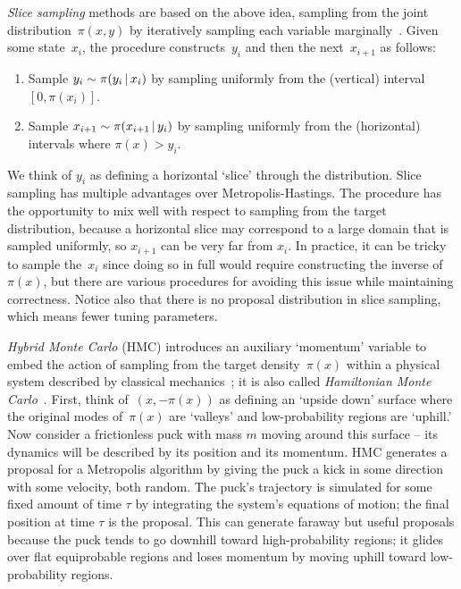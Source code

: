 \documentclass[angelino.tex]{subfiles}
\begin{document}
\emph{Slice sampling} methods are based on the above idea, sampling from the
joint distribution~$\pi(x, y)$ by iteratively sampling each variable 
marginally~\citep{neal:2003-slice}.
Given some state~$x_i$, the procedure constructs~$y_i$ and then
the next~$x_{i+1}$ as follows:
\begin{enumerate}
\item Sample $y_i \sim \pi(y_i \,|\, x_i)$ by sampling
      uniformly from the (vertical) interval $[0, \pi(x_i)]$.
\item Sample $x_{i+1} \sim \pi(x_{i+1} \,|\, y_i)$ by sampling uniformly
      from the (horizontal) intervals where $\pi(x) > y_i$.
\end{enumerate}
We think of $y_i$ as defining a horizontal `slice' through the distribution.
Slice sampling has multiple advantages over Metropolis-Hastings.
The procedure has the opportunity to mix well with respect to sampling from
the target distribution, because a horizontal slice may correspond to a
large domain that is sampled uniformly, so $x_{i+1}$ can be very far from $x_i$.
In practice, it can be tricky to sample the~$x_i$ since doing so in full
would require constructing the inverse of $\pi(x)$, but there are various
procedures for avoiding this issue while maintaining correctness.
Notice also that there is no proposal distribution in slice sampling,
which means fewer tuning parameters. %

\emph{Hybrid Monte Carlo} (HMC) introduces an auxiliary `momentum' variable
to embed the action of sampling from the target density~$\pi(x)$ within a
physical system  described by classical mechanics~\citep{duane:1987-hmc};
it is also called \emph{Hamiltonian Monte Carlo}~\citep{neal:2010-hmc}.
First, think of~$(x, -\pi(x))$ as defining an `upside down' surface where the
original modes of~$\pi(x)$ are `valleys' and low-probability regions are
`uphill.'
Now consider a frictionless puck with mass $m$ moving around this surface --
its dynamics will be described by its position and its momentum.
HMC generates a proposal for a Metropolis algorithm by giving the puck a kick
in some direction with some velocity, both random.
The puck's trajectory is simulated for some fixed amount of time $\tau$ by
integrating the system's equations of motion; the final position at time $\tau$
is the proposal.
This can generate faraway but useful proposals because the puck
tends to go downhill toward high-probability regions;
it glides over flat equiprobable regions and loses momentum by moving
uphill toward low-probability regions.
\end{document}
